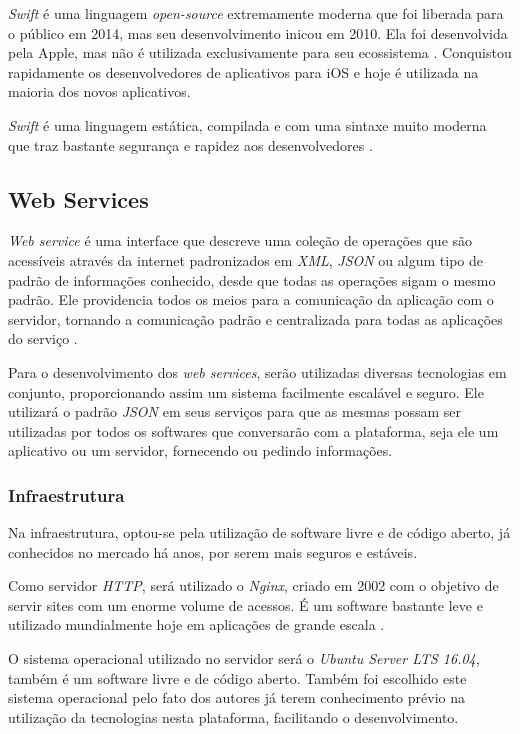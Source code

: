 \documentclass[
	12pt,
	oneside,
	a4paper,
	english,
	brazil,
]{abntex2}
\begin{document}
\emph{Swift} é uma linguagem \emph{open-source} extremamente moderna que foi liberada para o público em 2014, mas seu desenvolvimento inicou em 2010. Ela foi desenvolvida pela Apple, mas não é utilizada exclusivamente para seu ecossistema \cite{swift-about}. Conquistou rapidamente os desenvolvedores de aplicativos para iOS e hoje é utilizada na maioria dos novos aplicativos.

\emph{Swift} é uma linguagem estática, compilada e com uma sintaxe muito moderna que traz bastante segurança e rapidez aos desenvolvedores \cite{swift-about}.

\subsection{Web Services}

\emph{Web service} é uma interface que descreve uma coleção de operações que são acessíveis através da internet padronizados em \emph{XML}, \emph{JSON} ou algum tipo de padrão de informações conhecido, desde que todas as operações sigam o mesmo padrão. Ele providencia todos os meios para a comunicação da aplicação com o servidor, tornando a comunicação padrão e centralizada para todas as aplicações do serviço \cite{introduction-web-services}.

Para o desenvolvimento dos \emph{web services}, serão utilizadas diversas tecnologias em conjunto, proporcionando assim um sistema facilmente escalável e seguro. Ele utilizará o padrão \emph{JSON} em seus serviços para que as mesmas possam ser utilizadas por todos os softwares que conversarão com a plataforma, seja ele um aplicativo ou um servidor, fornecendo ou pedindo informações.

\subsubsection{Infraestrutura}

Na infraestrutura, optou-se pela utilização de software livre e de código aberto, já conhecidos no mercado há anos, por serem mais seguros e estáveis.

Como servidor \emph{HTTP}, será utilizado o \emph{Nginx}, criado em 2002 com o objetivo de servir sites com um enorme volume de acessos. É um software bastante leve e utilizado mundialmente hoje em aplicações de grande escala \cite{nginx-book}.

O sistema operacional utilizado no servidor será o \emph{Ubuntu Server LTS 16.04}, também é um software livre e de código aberto. Também foi escolhido este sistema operacional pelo fato dos autores já terem conhecimento prévio na utilização da tecnologias nesta plataforma, facilitando o desenvolvimento.
\end{document}
